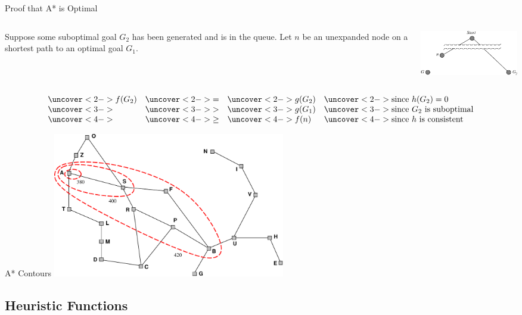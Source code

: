 \documentclass[14pt]{beamer}
\begin{document}
\begin{frame}{Proof that A* is Optimal}
\begin{columns}[T]
\begin{column}{1.75in}
Suppose some suboptimal goal $G_2$ has been generated and is in the queue. Let $n$ be an unexpanded node on a shortest path to an optimal goal $G_1$.
\end{column}
\begin{column}{2.25in}
\includegraphics[width=2.25in]{a-star-proof.pdf}
\end{column}
\end{columns}
\bigskip
\[
\begin{array}{llll}
\uncover<2->{f(G_2)} & \uncover<2->{=  }  & \uncover<2->{g(G_2)} & \uncover<2->{\mbox{since $h(G_2) = 0$}} \\
\uncover<3->{      } & \uncover<3->{>  }  & \uncover<3->{g(G_1)} & \uncover<3->{\mbox{since $G_2$ is suboptimal}} \\
\uncover<4->{      } & \uncover<4->{\geq} & \uncover<4->{f(n)  } & \uncover<4->{\mbox{since $h$ is consistent}}
\end{array}
\]
\bigskip
{}
\end{frame}
\begin{frame}{A* Contours}
\includegraphics[width=4in]{a-star-contours.pdf}
\end{frame}

\subsection{Heuristic Functions}
\end{document}
